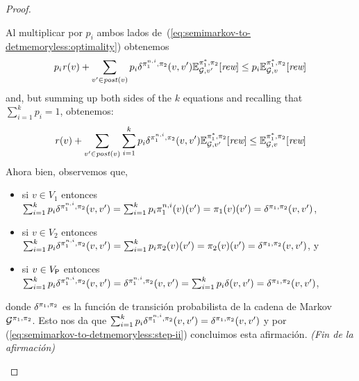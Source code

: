 \begin{proof}
\begin{proofofclaim}
    Al multiplicar por $p_i$ ambos lados de~(\ref{eq:semimarkov-to-detmemoryless:optimality}) obtenemos
    \begin{equation*}\label{eq:semimarkov-to-detmemoryless:step-i}
      p_i \mathit{r}(v) + \sum_{v' \in \mathit{post}(v)} p_i \delta^{\pi_{1}^{n,i},\pi_{2}}(v, v') \mathbb{E}^{\pi^*_{1}, \pi_{2}}_{\mathcal{G},v'}[\textit{rew}] \leq p_i \mathbb{E}^{\pi^*_{1}, \pi_{2}}_{\mathcal{G},v}[\textit{rew}]
    \end{equation*}
    and, but summing up both sides of the $k$ equations and recalling that
    $\sum_{i=1}^kp_i =1$, obtenemos:
    \begin{equation}\label{eq:semimarkov-to-detmemoryless:step-ii}
      \mathit{r}(v) + \sum_{v' \in \mathit{post}(v)}\sum_{i=1}^k p_i \delta^{\pi_{1}^{n,i},\pi_{2}}(v, v') \mathbb{E}^{\pi^*_{1}, \pi_{2}}_{\mathcal{G},v'}[\textit{rew}] \leq \mathbb{E}^{\pi^*_{1}, \pi_{2}}_{\mathcal{G},v}[\textit{rew}]
    \end{equation}
    Ahora bien, observemos que,
    \begin{itemize}
    \item%
    si $v\in V_1$ entonces
    $\sum_{i=1}^k p_i \delta^{\pi_{1}^{n,i},\pi_{2}}(v, v') = \sum_{i=1}^k p_i \pi_{1}^{n,i}(v)(v') = \pi_{1}(v)(v') = \delta^{\pi_{1},\pi_{2}}(v, v')$,
    \item%
    si $v\in V_2$ entonces
    $\sum_{i=1}^k p_i \delta^{\pi_{1}^{n,i},\pi_{2}}(v, v') = \sum_{i=1}^k p_i \pi_{2}(v)(v') = \pi_{2}(v)(v') = \delta^{\pi_{1},\pi_{2}}(v, v')$, y 
    \item%
    si $v\in V_{\mathsf{P}}$ entonces
    $\sum_{i=1}^k p_i \delta^{\pi_{1}^{n,i},\pi_{2}}(v, v') = \delta^{\pi_{1}^{n,i},\pi_{2}}(v, v') = \sum_{i=1}^k p_i \delta(v,v') = \delta^{\pi_{1},\pi_{2}}(v, v')$,
    \end{itemize}
    donde $\delta^{\pi_{1},\pi_{2}}$ es la función de transición probabilista de la cadena de Markov $\mathcal{G}^{\pi_{1},\pi_{2}}$.
    Esto nos da que
    $\sum_{i=1}^k p_i \delta^{\pi_{1}^{n,i},\pi_{2}}(v, v') = \delta^{\pi_{1},\pi_{2}}(v, v')$
    y por (\ref{eq:semimarkov-to-detmemoryless:step-ii}) concluimos esta afirmación.
    \hfill\emph{(Fin de la afirmación)}\qedhere
  \end{proofofclaim}


\end{proof}
